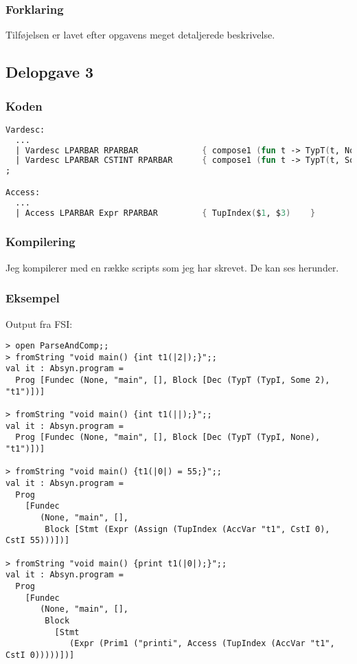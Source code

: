 \subsubsection{Forklaring}
Tilføjelsen er lavet efter opgavens meget detaljerede beskrivelse.

\subsection{Delopgave 3}\label{ass:3-3}
\subsubsection{Koden}
\begin{lstlisting}[language=fsharp]
Vardesc: 
  ...
  | Vardesc LPARBAR RPARBAR             { compose1 (fun t -> TypT(t, None)) $1    }
  | Vardesc LPARBAR CSTINT RPARBAR      { compose1 (fun t -> TypT(t, Some $3)) $1 }
;

Access:
  ...
  | Access LPARBAR Expr RPARBAR         { TupIndex($1, $3)    }   
\end{lstlisting}

\subsubsection{Kompilering}
Jeg kompilerer med en række scripts som jeg har skrevet. De kan ses herunder.









\subsubsection{Eksempel}
Output fra FSI:
\begin{lstlisting}
> open ParseAndComp;;
> fromString "void main() {int t1(|2|);}";;
val it : Absyn.program =
  Prog [Fundec (None, "main", [], Block [Dec (TypT (TypI, Some 2), "t1")])]

> fromString "void main() {int t1(||);}";;
val it : Absyn.program =
  Prog [Fundec (None, "main", [], Block [Dec (TypT (TypI, None), "t1")])]

> fromString "void main() {t1(|0|) = 55;}";;
val it : Absyn.program =
  Prog
    [Fundec
       (None, "main", [],
        Block [Stmt (Expr (Assign (TupIndex (AccVar "t1", CstI 0), CstI 55)))])]

> fromString "void main() {print t1(|0|);}";;
val it : Absyn.program =
  Prog
    [Fundec
       (None, "main", [],
        Block
          [Stmt
             (Expr (Prim1 ("printi", Access (TupIndex (AccVar "t1", CstI 0)))))])]
\end{lstlisting}

